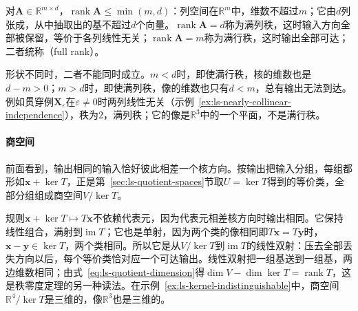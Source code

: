 对$\bm A\in\mathbb R^{m\times d}$，$\operatorname{rank}\bm A\leq\min(m,d)$：列空间在$\mathbb R^m$中，维数不超过$m$；它由$d$列张成，从中抽取出的基不超过$d$个向量。$\operatorname{rank}\bm A=d$称为满列秩，这时输入方向全部被保留，等价于各列线性无关；$\operatorname{rank}\bm A=m$称为满行秩，这时输出全部可达；二者统称（full rank）。

形状不同时，二者不能同时成立。$m<d$时，即使满行秩，核的维数也是$d-m>0$；$m>d$时，即使满列秩，像的维数也只有$d<m$，总有输出无法到达。例如贯穿例$\bm X_\varepsilon$在$\varepsilon\neq0$时两列线性无关（示例~\ref{ex:ls-nearly-collinear-independence}），秩为$2$，满列秩；它的像是$\mathbb R^3$中的一个平面，不是满行秩。

\paragraph{商空间}
前面看到，输出相同的输入恰好彼此相差一个核方向。按输出把输入分组，每组都形如$\bm x+\ker T$，正是第~\ref{sec:ls-quotient-spaces}节取$U=\ker T$得到的等价类，全部分组组成商空间$V/\ker T$。

规则$\bm x+\ker T\mapsto T\bm x$不依赖代表元，因为代表元相差核方向时输出相同。它保持线性组合，满射到$\operatorname{im}T$；它也是单射，因为两个类的像相同即$T\bm x=T\bm y$时，$\bm x-\bm y\in\ker T$，两个类相同。所以它是从$V/\ker T$到$\operatorname{im}T$的线性双射：压去全部丢失方向以后，每个等价类恰对应一个可达输出。线性双射把一组基送到一组基，两边维数相同；由式~\eqref{eq:ls-quotient-dimension}得$\dim V-\dim\ker T=\operatorname{rank}T$，这是秩零度定理的另一种读法。在示例~\ref{ex:ls-kernel-indistinguishable}中，商空间$\mathbb R^4/\ker T$是三维的，像$\mathbb R^3$也是三维的。

